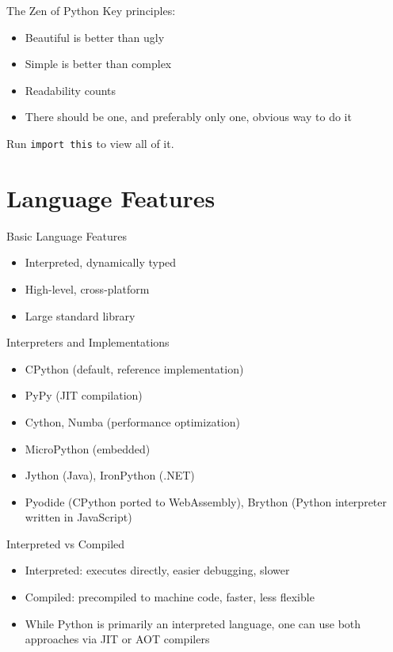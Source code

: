 \documentclass[12pt, aspectratio=169]{beamer}
\begin{document}
    \begin{frame}{The Zen of Python}
        Key principles:
        \begin{itemize}
            \item Beautiful is better than ugly
            \item Simple is better than complex
            \item Readability counts
            \item There should be one, and preferably only one, obvious way to do it
        \end{itemize}

        Run \texttt{import this} to view all of it.
    \end{frame}


    \section{Language Features}

        \begin{frame}{Basic Language Features}
        \begin{itemize}
            \item Interpreted, dynamically typed
            \item High-level, cross-platform
            \item Large standard library
        \end{itemize}
    \end{frame}


    \begin{frame}{Interpreters and Implementations}
        \begin{itemize}
            \item CPython (default, reference implementation)
            \item PyPy (JIT compilation)
            \item Cython, Numba (performance optimization)
            \item MicroPython (embedded)
            \item Jython (Java), IronPython (.NET)
            \item Pyodide (CPython ported to WebAssembly), Brython (Python interpreter written in JavaScript)
        \end{itemize}
    \end{frame}


    \begin{frame}{Interpreted vs Compiled}
        \begin{itemize}
            \item Interpreted: executes directly, easier debugging, slower
            \item Compiled: precompiled to machine code, faster, less flexible
            \item While Python is primarily an interpreted language, one can use both approaches via JIT or AOT compilers
        \end{itemize}
    \end{frame}
\end{document}
